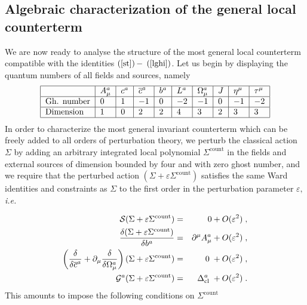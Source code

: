 \documentclass[a4paper,12pt]{article}
\begin{document}
\subsection{Algebraic characterization of the general local counterterm}

We are now ready to analyse the structure of the most general local
counterterm compatible with the identities $\left( \ref{st}\right) -$ $%
\left( \ref{lghi}\right) $. Let us begin by displaying the quantum numbers
of all fields and sources, namely 
\begin{equation}
\begin{tabular}{|l|l|l|l|l|l|l|l|l|l|}
\hline
& $A_{\mu }^{a}$ & $c^{a}$ & $\overline{c}^{a}$ & $b^{a}$ & $L^{a}$ & $%
\Omega _{\mu }^{a}$ & $J$ & $\eta ^{\mu }$ & $\tau ^{\mu }$ \\ \hline
Gh. number & $0$ & $1$ & $-1$ & $0$ & $-2$ & $-1$ & $0$ & $-1$ & $-2$ \\ 
\hline
Dimension & $1$ & $0$ & $2$ & $2$ & $4$ & $3$ & $2$ & $3$ & $3$ \\ \hline
\end{tabular}
\label{t1}
\end{equation}
In order to characterize the most general invariant counterterm which can be
freely added to all orders of perturbation theory, we perturb the classical
action $\Sigma $ by adding an arbitrary integrated local polynomial $\Sigma
^{\mathrm{count}}$ in the fields and external sources of dimension bounded
by four and with zero ghost number, and we require that the perturbed action 
$(\Sigma +\varepsilon \Sigma ^{\mathrm{count}})$ satisfies the same Ward
identities and constraints as $\Sigma $ to the first order in the
perturbation parameter $\varepsilon ,$ \textit{i.e.}

\begin{eqnarray}
\mathcal{S}(\Sigma +\varepsilon \Sigma ^{\mathrm{count}}) &=&0+O(\varepsilon
^{2})\;,  \nonumber \\
\frac{\delta (\Sigma +\varepsilon \Sigma ^{\mathrm{count}})}{\delta b^{a}}
&=&\partial ^{\mu }A_{\mu }^{a}+O(\varepsilon ^{2})\;,  \nonumber \\
\left( \frac{\delta }{\delta \overline{c}^{a}}+\partial _{\mu }\frac{\delta 
}{\delta \Omega _{\mu }^{a}}\right) (\Sigma +\varepsilon \Sigma ^{\mathrm{%
count}}) &=&0\;+O(\varepsilon ^{2})\;,  \nonumber \\
\mathcal{G}^{a}(\Sigma +\varepsilon \Sigma ^{\mathrm{count}}) &=&\Delta _{%
\mathrm{cl}}^{a}\;+O(\varepsilon ^{2})\;.  \label{cont-1}
\end{eqnarray}
This amounts to impose the following conditions on $\Sigma ^{\mathrm{count}}$
\end{document}
